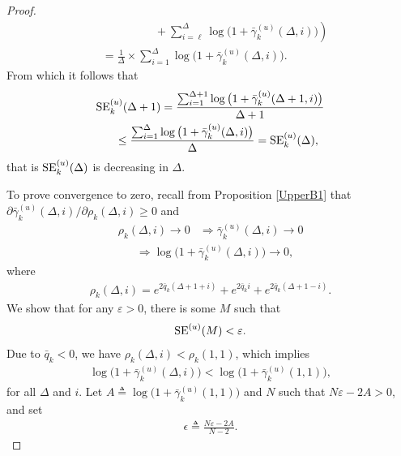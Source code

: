 \documentclass[conference, a4paper, 10pt]{IEEEtran}
\begin{document}
\begin{proof}
\begin{align}
&  ~~~~~~~~~~~~~~~~~~~~~+\left. \sum_{i=\ell}^{\Delta} \log\big(1 + \bar{\gamma}_k^{(u)}(\Delta,i)\big) \right)
\\
&=  \frac{1}{\Delta } \times \sum_{i=1}^{\Delta} \log\big(1 + \bar{\gamma}_k^{(u)}(\Delta,i)\big).
\end{align}
From which it follows that
\begin{align}
& \textup{SE}_k^{(u)}(\Delta+1) = \frac{\sum_{i=1}^{\Delta+1} \log\big(1 + \bar{\gamma}_k^{(u)}(\Delta + 1,i)\big)}{\Delta + 1}
\nonumber  \\
&~~~~~ \leq  \frac{\sum_{i=1}^{\Delta} \log\big(1 + \bar{\gamma}_k^{(u)}(\Delta ,i)\big)}{\Delta} = \textup{SE}_k^{(u)}(\Delta),
\label{eq:SEu}
\end{align}
that is $\textup{SE}_k^{(u)}(\Delta)$ is decreasing in $\Delta$.

To prove convergence to zero, recall from Proposition \ref{UpperB1} that
$\partial \bar{\gamma}_k^{(u)}(\Delta, i) / \partial \rho_k(\Delta, i) \geq 0$ and
\begin{align}
\nonumber
\rho_k(\Delta, i) \rightarrow 0 & \Rightarrow \bar{\gamma}_k^{(u)}(\Delta, i) \rightarrow 0
\end{align}
\begin{align}
&     \Rightarrow \log\big(1 + \bar{\gamma}_k^{(u)}(\Delta, i)\big) \rightarrow 0,
\label{eq:conv1}
\end{align}
where
\begin{align}
\nonumber
\rho_k(\Delta, i) = e^{2\bar{q}_k (\Delta + 1 + i)} + e^{2\bar{q}_k  i} + e^{2\bar{q}_k (\Delta + 1 - i)}.
\end{align}
We show that for any $\varepsilon > 0$, there is some $M$ such that
\begin{align}
 \textup{SE}^{(u)}(M) < \varepsilon.
\end{align}
Due to $\bar{q}_k < 0$, we have $\rho_k(\Delta, i) < \rho_k(1,1)$,
which implies
\begin{align}
    \log\big(1 + \bar{\gamma}_k^{(u)}(\Delta, i)\big) < \log\big(1 + \bar{\gamma}_k^{(u)}(1, 1)\big),
\end{align}
for all $\Delta$ and $i$.
Let $A \triangleq \log\big(1 + \bar{\gamma}_k^{(u)}(1, 1)\big)$
and
$N$ such that $N\varepsilon - 2A > 0$, and set
\begin{align}
\label{eq:epsilon}
    \epsilon \triangleq \frac{N\varepsilon - 2A}{N - 2}.
\end{align}


\end{proof}
\end{document}
